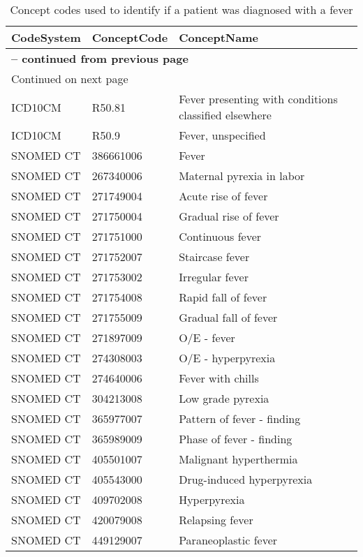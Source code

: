 \begin{longtable}{p{}p{}p{}}
\caption{Concept codes used to identify if a patient was diagnosed with a fever} \\ 
 CodeSystem & ConceptCode & ConceptName \\ 
  \hline 
\endfirsthead 
\multicolumn{3}{p{\textwidth}}{{ \bfseries \tablename \thetable{} -- continued from previous page}} \ 
\hline CodeSystem & ConceptCode & ConceptName \\ \hline 
\endhead 
\hline \multicolumn{3}{p{\textwidth}}{{Continued on next page}} \\ \hline 
\endfoot 
\hline 
\endlastfoot 
 \hline
ICD10CM & R50.81 & Fever presenting with conditions classified elsewhere \\ 
  ICD10CM & R50.9 & Fever, unspecified \\ 
  SNOMED CT & 386661006 & Fever \\ 
  SNOMED CT & 267340006 & Maternal pyrexia in labor \\ 
  SNOMED CT & 271749004 & Acute rise of fever \\ 
  SNOMED CT & 271750004 & Gradual rise of fever \\ 
  SNOMED CT & 271751000 & Continuous fever \\ 
  SNOMED CT & 271752007 & Staircase fever \\ 
  SNOMED CT & 271753002 & Irregular fever \\ 
  SNOMED CT & 271754008 & Rapid fall of fever \\ 
  SNOMED CT & 271755009 & Gradual fall of fever \\ 
  SNOMED CT & 271897009 & O/E - fever \\ 
  SNOMED CT & 274308003 & O/E - hyperpyrexia \\ 
  SNOMED CT & 274640006 & Fever with chills \\ 
  SNOMED CT & 304213008 & Low grade pyrexia \\ 
  SNOMED CT & 365977007 & Pattern of fever - finding \\ 
  SNOMED CT & 365989009 & Phase of fever - finding \\ 
  SNOMED CT & 405501007 & Malignant hyperthermia \\ 
  SNOMED CT & 405543000 & Drug-induced hyperpyrexia \\ 
  SNOMED CT & 409702008 & Hyperpyrexia \\ 
  SNOMED CT & 420079008 & Relapsing fever \\ 
  SNOMED CT & 449129007 & Paraneoplastic fever \\ 

\end{longtable}
